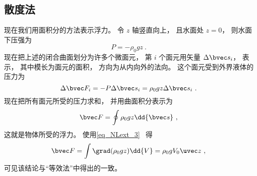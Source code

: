 \subsection{散度法}

现在我们用面积分的方法表示浮力。 令 $z$ 轴竖直向上， 且水面处 $z = 0$， 则水面下压强为
\begin{equation}
P = -\rho_0 g z~.
\end{equation}
现在把上述的闭合曲面划分为许多个微面元， 第 $i$ 个面元用矢量 $\Delta \bvec s_i$， 表示， 其中模长为面元的面积， 方向为从内向外的法向。 这个面元受到外界液体的压力为
\begin{equation}
\Delta \bvec F_i = -P\Delta \bvec s_i = \rho_0 g z \Delta \bvec s_i~.
\end{equation}
现在把所有面元所受的压力求和， 并用曲面积分表示为
\begin{equation}
\bvec F = \oint \rho_0 g z \dd{\bvec s}~,
\end{equation}
这就是物体所受的浮力。 使用\autoref{eq_NLext_3}~ 得
\begin{equation}
\bvec F = \int \grad(\rho_0 g z) \dd{V} = \rho_0 g V_0 \uvec z~,
\end{equation}
可见该结论与“等效法”中得出的一致。
